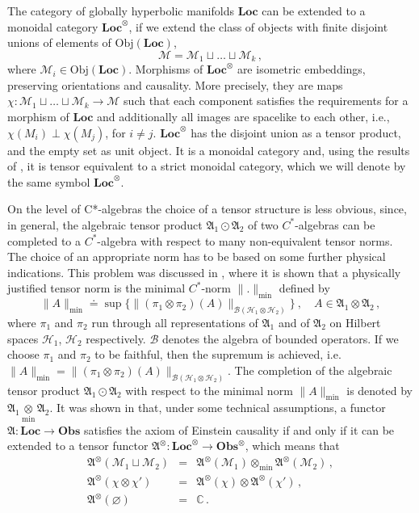 \documentclass[11pt]{article}
\newcommand{\fA}{\mathfrak{A}}
\newcommand{\Bcal}{\mathcal {B}}
\newcommand{\Hcal}{\mathcal{H}}
\newcommand{\Mcal}{\mathcal{M}}
\newcommand{\obj}{\mathrm{Obj}}
\newcommand{\Loc}{\mathrm{\mathbf{Loc}}}       %
\newcommand{\Obs}{\mathrm{\mathbf{Obs}}}       %
\newcommand{\CC}{\mathbb{C}}           %
\newcommand{\sst}[1]{\scriptscriptstyle{#1}}  %
\newcommand{\1}{\mathds{1}}                         %
\begin{document}
The category of globally hyperbolic manifolds $\Loc$ can be extended to a monoidal category $\Loc^\otimes$, if we extend the class of objects with finite disjoint unions of elements of $\obj(\Loc)$, 
\[\Mcal=\Mcal_1\sqcup \ldots\sqcup \Mcal_k\,,
\] 
where $\Mcal_i\in\obj(\Loc)$. Morphisms of $\Loc^\otimes$ are isometric embeddings, preserving orientations and causality. More precisely, they are maps $\chi: \Mcal_1\sqcup \ldots\sqcup \Mcal_k\rightarrow  \Mcal$ such that each component satisfies the requirements for a morphism of $\Loc$ and additionally all images are spacelike to each other, i.e., $\chi(M_i) \perp\chi(M_j)$, for $i\neq j$. $\Loc^\otimes$ has the disjoint union as a tensor product, and the empty set as unit object. It is a monoidal category and, using the results of \cite{JoSt}, it is tensor equivalent to a strict monoidal category, which we will denote by the same symbol $\Loc^\otimes$.

On the level of C*-algebras the choice of a tensor structure is less obvious, since, in general, the algebraic tensor product $\fA_1\odot\fA_2$ of two $C^*$-algebras can be completed to a $C^*$-algebra with respect to many non-equivalent tensor norms. The choice of an appropriate norm has to be based on some further physical indications. This problem was discussed in \cite{BFIR}, where it is shown that  
a physically justified tensor norm is the minimal $C^*$-norm $\|.\|_{\textrm{min}}$ defined by
\[
\|A\|_{\textrm{min}} \doteq \sup\{\|(\pi_1\otimes\pi_2)(A)\|_{\Bcal(\Hcal_1\otimes\Hcal_2)}\}\ , \quad A\in\fA_1\otimes\fA_2\,,
\]
where $\pi_1$ and $\pi_2$ run through all representations of $\fA_1$ and of $\fA_2$ on Hilbert spaces $\Hcal_1$, $\Hcal_2$ respectively. $\Bcal$ denotes the algebra of bounded operators. If we choose $\pi_1$ and $\pi_2$ to be faithful, then the
supremum is achieved, i.e. $\|A\|_{\textrm{min}}=\|(\pi_1\otimes\pi_2)(A)\|_{\Bcal(\Hcal_1\otimes\Hcal_2)}$.
The completion of the algebraic tensor product $\fA_1\odot\fA_2$  with respect to the minimal norm $\|A\|_{\textrm{min}}$ is denoted by $\fA_1\underset{\sst{\textrm{min}}}{\otimes}\fA_2$. It was shown in \cite{BFIR} that, under some technical assumptions, %
a functor $\fA:\Loc\rightarrow\Obs$ satisfies the axiom of Einstein causality if and only if it can be extended to a tensor functor $\fA^\otimes:\Loc^\otimes\rightarrow\Obs^\otimes$, which means that
\begin{eqnarray}
\fA^\otimes\left(\Mcal_1\sqcup \Mcal_2\right)&=&\fA^\otimes(\Mcal_1)\otimes_{\textrm{min}}\fA^\otimes(\Mcal_2)\,,\\
\fA^\otimes(\chi\otimes\chi')&=&\fA^\otimes(\chi)\otimes\fA^\otimes(\chi')\,,\\
\fA^\otimes(\varnothing)&=&\CC\,.
\end{eqnarray}
\end{document}
